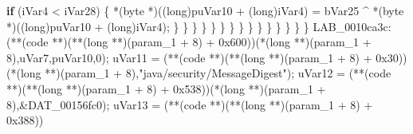 \documentclass[
]{article}
\newenvironment{Shaded}{}{}
\newcommand{\BaseNTok}[1]{\textcolor[rgb]{0.25,0.63,0.44}{#1}}
\newcommand{\ControlFlowTok}[1]{\textcolor[rgb]{0.00,0.44,0.13}{\textbf{#1}}}
\newcommand{\DataTypeTok}[1]{\textcolor[rgb]{0.56,0.13,0.00}{#1}}
\newcommand{\DecValTok}[1]{\textcolor[rgb]{0.25,0.63,0.44}{#1}}
\newcommand{\NormalTok}[1]{#1}
\newcommand{\OperatorTok}[1]{\textcolor[rgb]{0.40,0.40,0.40}{#1}}
\newcommand{\StringTok}[1]{\textcolor[rgb]{0.25,0.44,0.63}{#1}}
\begin{document}
\begin{Shaded}
\begin{Highlighting}[]
                              \ControlFlowTok{if} \OperatorTok{(}\NormalTok{iVar4 }\OperatorTok{\textless{}}\NormalTok{ iVar28}\OperatorTok{)} \OperatorTok{\{}
                                \OperatorTok{*(}\NormalTok{byte }\OperatorTok{*)((}\DataTypeTok{long}\OperatorTok{)}\NormalTok{puVar10 }\OperatorTok{+} \OperatorTok{(}\DataTypeTok{long}\OperatorTok{)}\NormalTok{iVar4}\OperatorTok{)} \OperatorTok{=}
\NormalTok{                                     bVar25 }\OperatorTok{\^{}} \OperatorTok{*(}\NormalTok{byte }\OperatorTok{*)((}\DataTypeTok{long}\OperatorTok{)}\NormalTok{puVar10 }\OperatorTok{+} \OperatorTok{(}\DataTypeTok{long}\OperatorTok{)}\NormalTok{iVar4}\OperatorTok{);}
                              \OperatorTok{\}}
                            \OperatorTok{\}}
                          \OperatorTok{\}}
                        \OperatorTok{\}}
                      \OperatorTok{\}}
                    \OperatorTok{\}}
                  \OperatorTok{\}}
                \OperatorTok{\}}
              \OperatorTok{\}}
            \OperatorTok{\}}
          \OperatorTok{\}}
        \OperatorTok{\}}
      \OperatorTok{\}}
    \OperatorTok{\}}
  \OperatorTok{\}}
\NormalTok{LAB\_0010ca3c}\OperatorTok{:}
  \OperatorTok{(**(}\NormalTok{code }\OperatorTok{**)(**(}\DataTypeTok{long} \OperatorTok{**)(}\NormalTok{param\_1 }\OperatorTok{+} \DecValTok{8}\OperatorTok{)} \OperatorTok{+} \BaseNTok{0x600}\OperatorTok{))(*(}\DataTypeTok{long} \OperatorTok{**)(}\NormalTok{param\_1 }\OperatorTok{+} \DecValTok{8}\OperatorTok{),}\NormalTok{uVar7}\OperatorTok{,}\NormalTok{puVar10}\OperatorTok{,}\DecValTok{0}\OperatorTok{);}
\NormalTok{  uVar11 }\OperatorTok{=} \OperatorTok{(**(}\NormalTok{code }\OperatorTok{**)(**(}\DataTypeTok{long} \OperatorTok{**)(}\NormalTok{param\_1 }\OperatorTok{+} \DecValTok{8}\OperatorTok{)} \OperatorTok{+} \BaseNTok{0x30}\OperatorTok{))}
                     \OperatorTok{(*(}\DataTypeTok{long} \OperatorTok{**)(}\NormalTok{param\_1 }\OperatorTok{+} \DecValTok{8}\OperatorTok{),}\StringTok{"java/security/MessageDigest"}\OperatorTok{);}
\NormalTok{  uVar12 }\OperatorTok{=} \OperatorTok{(**(}\NormalTok{code }\OperatorTok{**)(**(}\DataTypeTok{long} \OperatorTok{**)(}\NormalTok{param\_1 }\OperatorTok{+} \DecValTok{8}\OperatorTok{)} \OperatorTok{+} \BaseNTok{0x538}\OperatorTok{))(*(}\DataTypeTok{long} \OperatorTok{**)(}\NormalTok{param\_1 }\OperatorTok{+} \DecValTok{8}\OperatorTok{),\&}\NormalTok{DAT\_00156fc0}\OperatorTok{);}
\NormalTok{  uVar13 }\OperatorTok{=} \OperatorTok{(**(}\NormalTok{code }\OperatorTok{**)(**(}\DataTypeTok{long} \OperatorTok{**)(}\NormalTok{param\_1 }\OperatorTok{+} \DecValTok{8}\OperatorTok{)} \OperatorTok{+} \BaseNTok{0x388}\OperatorTok{))}

\end{Highlighting}
\end{Shaded}
\end{document}

